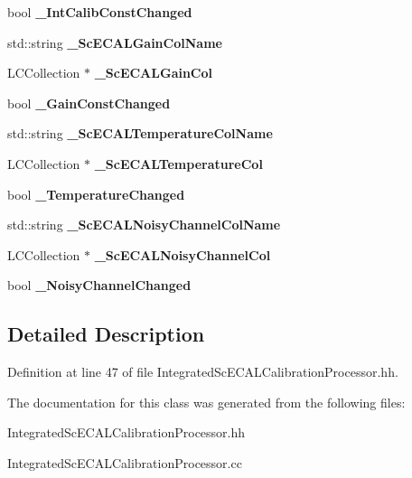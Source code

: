 \begin{DoxyCompactItemize}
\item 
bool {\bfseries \_\-IntCalibConstChanged}\label{classCALICE_1_1IntegratedScECALCalibrationProcessor_a79ad2dea374a18735ecf63568815738e}

\item 
std::string {\bfseries \_\-ScECALGainColName}\label{classCALICE_1_1IntegratedScECALCalibrationProcessor_a35226bdbae7c441b3537037d5100d27c}

\item 
LCCollection $\ast$ {\bfseries \_\-ScECALGainCol}\label{classCALICE_1_1IntegratedScECALCalibrationProcessor_aafd6b24dd5fbfcf0abeeb5c887faa07a}

\item 
bool {\bfseries \_\-GainConstChanged}\label{classCALICE_1_1IntegratedScECALCalibrationProcessor_ab7f94c6e651268e510283572be35fb5f}

\item 
std::string {\bfseries \_\-ScECALTemperatureColName}\label{classCALICE_1_1IntegratedScECALCalibrationProcessor_a3965c116379097f3dd18979b694d23e4}

\item 
LCCollection $\ast$ {\bfseries \_\-ScECALTemperatureCol}\label{classCALICE_1_1IntegratedScECALCalibrationProcessor_a48a9a574f0f7377f9e8dc16a99b7a45a}

\item 
bool {\bfseries \_\-TemperatureChanged}\label{classCALICE_1_1IntegratedScECALCalibrationProcessor_ab2e5c24c94b27fd94a70bebb8a071aea}

\item 
std::string {\bfseries \_\-ScECALNoisyChannelColName}\label{classCALICE_1_1IntegratedScECALCalibrationProcessor_a234c5e12f557aebf5752f95e53ca68a7}

\item 
LCCollection $\ast$ {\bfseries \_\-ScECALNoisyChannelCol}\label{classCALICE_1_1IntegratedScECALCalibrationProcessor_aa04542cfddd279b2c0254916e9d830a2}

\item 
bool {\bfseries \_\-NoisyChannelChanged}\label{classCALICE_1_1IntegratedScECALCalibrationProcessor_a920d09ab58c742d08d16599ab661eae2}

\end{DoxyCompactItemize}


\subsection{Detailed Description}


Definition at line 47 of file IntegratedScECALCalibrationProcessor.hh.

The documentation for this class was generated from the following files:\begin{DoxyCompactItemize}
\item 
IntegratedScECALCalibrationProcessor.hh\item 
IntegratedScECALCalibrationProcessor.cc\end{DoxyCompactItemize}
